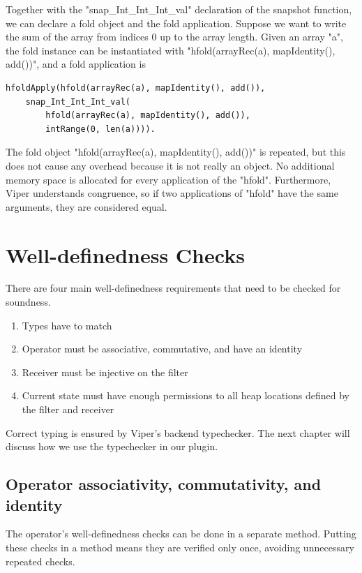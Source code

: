 \documentclass[msc,oneside]{ubcthesis}
\theoremstyle{definition}
\begin{document}
Together with the "snap_Int_Int_Int_val" declaration of the snapshot function, we can declare a fold object and the fold application. Suppose we want to write the sum of the array from indices 0 up to the array length. Given an array "a", the fold instance can be instantiated with "hfold(arrayRec(a), mapIdentity(), add())", and a fold application is 
\begin{lstlisting}
hfoldApply(hfold(arrayRec(a), mapIdentity(), add()),
    snap_Int_Int_Int_val(
        hfold(arrayRec(a), mapIdentity(), add()), 
        intRange(0, len(a)))).
\end{lstlisting}
The fold object "hfold(arrayRec(a), mapIdentity(), add())" is repeated, but this does not cause any overhead because it is not really an object. No additional memory space is allocated for every application of the "hfold". Furthermore, Viper understands congruence, so if two applications of "hfold" have the same arguments, they are considered equal.

\section{Well-definedness Checks}
There are four main well-definedness requirements that need to be checked for soundness.
\begin{enumerate}
    \item Types have to match
    \item Operator must be associative, commutative, and have an identity
    \item Receiver must be injective on the filter
    \item Current state must have enough permissions to all heap locations defined by the filter and receiver
\end{enumerate}

Correct typing is ensured by Viper's backend typechecker. The next chapter will discuss how we use the typechecker in our plugin. 

\subsection{Operator associativity, commutativity, and identity}
The operator's well-definedness checks can be done in a 
separate method. Putting these checks in a method means they are verified only once, avoiding unnecessary repeated checks.
\end{document}

